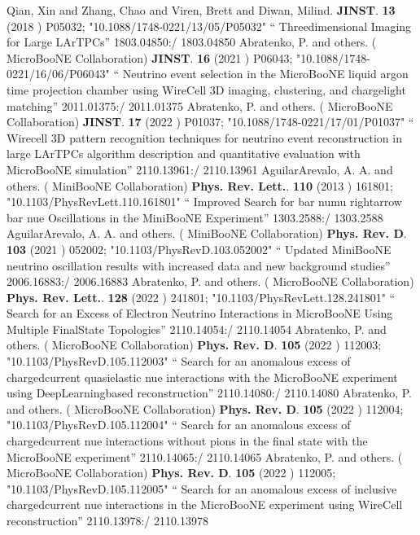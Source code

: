 \documentclass{article}
\begin{document}
\begin{thebibliography}{99}
  Qian, Xin and Zhang, Chao and Viren, Brett and Diwan, Milind. {\bf  JINST}. {\bf  13} (2018 )  P05032;  "10.1088/1748-0221/13/05/P05032" `` Threedimensional Imaging for Large LArTPCs'' 1803.04850:/ 1803.04850
  Abratenko, P. and others. ( MicroBooNE Collaboration) {\bf  JINST}. {\bf  16} (2021 )  P06043;  "10.1088/1748-0221/16/06/P06043" `` Neutrino event selection in the MicroBooNE liquid argon time projection chamber using WireCell 3D imaging, clustering, and chargelight matching'' 2011.01375:/ 2011.01375
  Abratenko, P. and others. ( MicroBooNE Collaboration) {\bf  JINST}. {\bf  17} (2022 )  P01037;  "10.1088/1748-0221/17/01/P01037" `` Wirecell 3D pattern recognition techniques for neutrino event reconstruction in large LArTPCs algorithm description and quantitative evaluation with MicroBooNE simulation'' 2110.13961:/ 2110.13961
  AguilarArevalo, A. A. and others. ( MiniBooNE Collaboration) {\bf  Phys. Rev. Lett.}. {\bf  110} (2013 )  161801;  "10.1103/PhysRevLett.110.161801" `` Improved Search for bar numu rightarrow bar nue Oscillations in the MiniBooNE Experiment'' 1303.2588:/ 1303.2588
  AguilarArevalo, A. A. and others. ( MiniBooNE Collaboration) {\bf  Phys. Rev. D}. {\bf  103} (2021 )  052002;  "10.1103/PhysRevD.103.052002" `` Updated MiniBooNE neutrino oscillation results with increased data and new background studies'' 2006.16883:/ 2006.16883
  Abratenko, P. and others. ( MicroBooNE Collaboration) {\bf  Phys. Rev. Lett.}. {\bf  128} (2022 )  241801;  "10.1103/PhysRevLett.128.241801" `` Search for an Excess of Electron Neutrino Interactions in MicroBooNE Using Multiple FinalState Topologies'' 2110.14054:/ 2110.14054
  Abratenko, P. and others. ( MicroBooNE Collaboration) {\bf  Phys. Rev. D}. {\bf  105} (2022 )  112003;  "10.1103/PhysRevD.105.112003" `` Search for an anomalous excess of chargedcurrent quasielastic nue interactions with the MicroBooNE experiment using DeepLearningbased reconstruction'' 2110.14080:/ 2110.14080
  Abratenko, P. and others. ( MicroBooNE Collaboration) {\bf  Phys. Rev. D}. {\bf  105} (2022 )  112004;  "10.1103/PhysRevD.105.112004" `` Search for an anomalous excess of chargedcurrent nue interactions without pions in the final state with the MicroBooNE experiment'' 2110.14065:/ 2110.14065
  Abratenko, P. and others. ( MicroBooNE Collaboration) {\bf  Phys. Rev. D}. {\bf  105} (2022 )  112005;  "10.1103/PhysRevD.105.112005" `` Search for an anomalous excess of inclusive chargedcurrent nue interactions in the MicroBooNE experiment using WireCell reconstruction'' 2110.13978:/ 2110.13978

\end{thebibliography}
\end{document}

